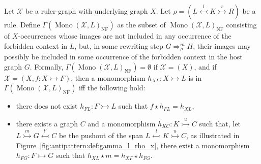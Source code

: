 \begin{definition}
    \label{antipattern:def:gamma_l_rho_x}
    Let $\mathcal{X}$ be a ruler-graph with underlying graph $X$. 
    Let \( \rho = (L \overset{l}{\leftarrowtail} K \overset{r}{\rightarrowtail} R) \) be a rule.
    Define $\Gamma(\operatorname{Mono}(\mathcal{X},L)_{\operatorname{NF}})$ as the subset of $\operatorname{Mono}(\mathcal{X},L)_{\operatorname{NF}}$ consisting of $X$-occurrences whose images are not included in any occurrence of the forbidden context in $L$,
    but, in some rewriting step $G \Rightarrow_\rho^m H$, their images may possibly be included in some occurrence of the forbidden context in the host graph $G$.
    Formally,  $\Gamma(\operatorname{Mono}(\mathcal{X},L)_{\operatorname{NF}}) = \emptyset$ if $\mathcal{X} = (X)$, and if $\mathcal{X} = (X, f:X \rightarrowtail F)$, then a monomorphism $h_{XL}:X \rightarrowtail L$ is in $\Gamma(\operatorname{Mono}(\mathcal{X},L)_{\operatorname{NF}})$ iff the following hold:
    \begin{itemize}
        \item there does not exist $h_{FL}:F \rightarrowtail L$ such that $f \star h_{FL} = h_{XL}$,
         \item there exists a graph $C$ and a monomorphism $h_{KC}:K \overset{u}{\rightarrowtail} C$ such that, let $L \overset{m}{\rightarrowtail} G \overset{l'}{\leftarrowtail} C$ be the pushout of the span $L \overset{l}{\leftarrowtail} K \overset{u}{\rightarrowtail} C$, as illustrated in Figure~\ref{fig:antipattern:def:gamma_l_rho_x},
         there exist a monomorphism $h_{FG} : F \rightarrowtail G$ such that 
         $h_{XL} \star m = h_{XF} \star h_{FG}$. 
      \begin{center}
\end{center}
\end{itemize}
\end{definition}
